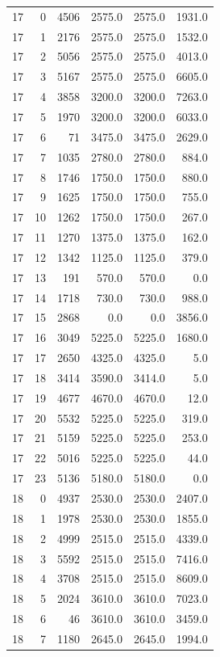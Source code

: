 \begin{longtable}{rrrrrr}
17 & 0 & 4506 & 2575.0 & 2575.0 & 1931.0\\
17 & 1 & 2176 & 2575.0 & 2575.0 & 1532.0\\
17 & 2 & 5056 & 2575.0 & 2575.0 & 4013.0\\
17 & 3 & 5167 & 2575.0 & 2575.0 & 6605.0\\
17 & 4 & 3858 & 3200.0 & 3200.0 & 7263.0\\
17 & 5 & 1970 & 3200.0 & 3200.0 & 6033.0\\
17 & 6 & 71 & 3475.0 & 3475.0 & 2629.0\\
17 & 7 & 1035 & 2780.0 & 2780.0 & 884.0\\
17 & 8 & 1746 & 1750.0 & 1750.0 & 880.0\\
17 & 9 & 1625 & 1750.0 & 1750.0 & 755.0\\
17 & 10 & 1262 & 1750.0 & 1750.0 & 267.0\\
17 & 11 & 1270 & 1375.0 & 1375.0 & 162.0\\
17 & 12 & 1342 & 1125.0 & 1125.0 & 379.0\\
17 & 13 & 191 & 570.0 & 570.0 & 0.0\\
17 & 14 & 1718 & 730.0 & 730.0 & 988.0\\
17 & 15 & 2868 & 0.0 & 0.0 & 3856.0\\
17 & 16 & 3049 & 5225.0 & 5225.0 & 1680.0\\
17 & 17 & 2650 & 4325.0 & 4325.0 & 5.0\\
17 & 18 & 3414 & 3590.0 & 3414.0 & 5.0\\
17 & 19 & 4677 & 4670.0 & 4670.0 & 12.0\\
17 & 20 & 5532 & 5225.0 & 5225.0 & 319.0\\
17 & 21 & 5159 & 5225.0 & 5225.0 & 253.0\\
17 & 22 & 5016 & 5225.0 & 5225.0 & 44.0\\
17 & 23 & 5136 & 5180.0 & 5180.0 & 0.0\\
18 & 0 & 4937 & 2530.0 & 2530.0 & 2407.0\\
18 & 1 & 1978 & 2530.0 & 2530.0 & 1855.0\\
18 & 2 & 4999 & 2515.0 & 2515.0 & 4339.0\\
18 & 3 & 5592 & 2515.0 & 2515.0 & 7416.0\\
18 & 4 & 3708 & 2515.0 & 2515.0 & 8609.0\\
18 & 5 & 2024 & 3610.0 & 3610.0 & 7023.0\\
18 & 6 & 46 & 3610.0 & 3610.0 & 3459.0\\
18 & 7 & 1180 & 2645.0 & 2645.0 & 1994.0\\

\end{longtable}

